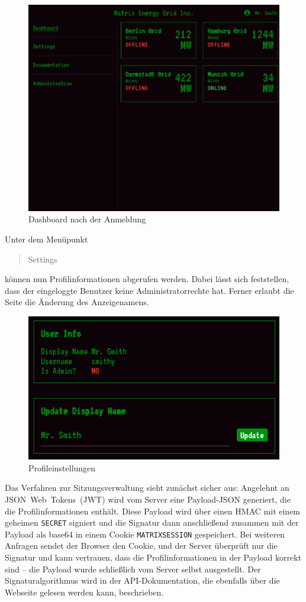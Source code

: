 \begin{figure}[!ht]
    \centering
    \includegraphics[width=.7\textwidth]{img/dashboard.png}
    \caption{Dashboard nach der Anmeldung}
\end{figure}

Unter dem Menüpunkt \blockquote{Settings} können nun Profilinformationen abgerufen werden. Dabei lässt sich feststellen, dass der eingeloggte Benutzer keine Administratorrechte hat. Ferner erlaubt die Seite die Änderung des Anzeigenamens.

\begin{figure}
    \centering
    \includegraphics[width=.5\textwidth]{img/settings.png}
    \caption{Profileinstellungen}
\end{figure}

Das Verfahren zur Sitzungsverwaltung sieht zunächst sicher aus:
Angelehnt an JSON~Web~Tokens~(JWT) wird vom Server eine Payload-JSON generiert, die die Profilinformationen enthält.
Diese Payload wird über einen HMAC mit einem geheimen \texttt{SECRET} signiert und die Signatur dann anschließend zusammen mit der Payload als base64 in einem Cookie \texttt{MATRIXSESSION} gespeichert.
Bei weiteren Anfragen sendet der Browser den Cookie, und der Server überprüft nur die Signatur und kann vertrauen, dass die Profilinformationen in der Payload korrekt sind -- die Payload wurde schließlich vom Server selbst ausgestellt.
Der Signaturalgorithmus wird in der API-Dokumentation, die ebenfalls über die Webseite gelesen werden kann, beschrieben.

